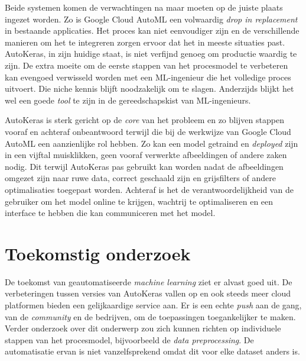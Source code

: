 \documentclass[a0,portrait]{a0poster}
\begin{document}
\begin{multicols}{2}
Beide systemen komen de verwachtingen na maar moeten op de juiste plaats ingezet worden. Zo is Google Cloud AutoML een volwaardig \textit{drop in replacement} in bestaande applicaties. Het proces kan niet eenvoudiger zijn en de verschillende manieren om het te integreren zorgen ervoor dat het in meeste situaties past. AutoKeras, in zijn huidige staat, is niet verfijnd genoeg om productie waardig te zijn. De extra moeite om de eerste stappen van het procesmodel te verbeteren kan evengoed verwisseld worden met een ML-ingenieur die het volledige proces uitvoert. Die niche kennis blijft noodzakelijk om te slagen. Anderzijds blijkt het wel een goede \textit{tool} te zijn in de gereedschapskist van ML-ingenieurs.

AutoKeras is sterk gericht op de \textit{core} van het probleem en zo blijven stappen vooraf en achteraf onbeantwoord terwijl die bij de werkwijze van Google Cloud AutoML een aanzienlijke rol hebben. Zo kan een model getraind en \textit{deployed} zijn in een vijftal muisklikken, geen vooraf verwerkte afbeeldingen of andere zaken nodig. Dit terwijl AutoKeras pas gebruikt kan worden nadat de afbeeldingen omgezet zijn naar ruwe data, correct geschaald zijn en grijsfilters of andere optimalisaties toegepast worden. Achteraf is het de verantwoordelijkheid van de gebruiker om het model online te krijgen, wachtrij te optimaliseren en een interface te hebben die kan communiceren met het model.

\color{HoGentAccent1} 
\section*{Toekomstig onderzoek}
\color{black}

De toekomst van geautomatiseerde \textit{machine learning} ziet er alvast goed uit. De verbeteringen tussen versies van AutoKeras vallen op en ook steeds meer cloud platformen bieden een gelijkaardige service aan. Er is een echte \textit{push} aan de gang, van de \textit{community} en de bedrijven, om de toepassingen toegankelijker te maken. Verder onderzoek over dit onderwerp zou zich kunnen richten op individuele stappen van het procesmodel, bijvoorbeeld de \textit{data preprocessing}. De automatisatie ervan is niet vanzelfsprekend omdat dit voor elke dataset anders is.



\end{multicols}
\end{document}
